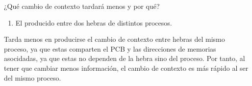 \begin{ejercicio}\label{ej:2.Ejercicio23}
    ¿Qué cambio de contexto tardará menos y por qué?
    \begin{enumerate}[label=(\alph*)]
      \myitem \textbf{El producido entre dos hebras del mismo proceso.}
      \item El producido entre dos hebras de distintos procesos.
    \end{enumerate}

    Tarda menos en producirse el cambio de contexto entre hebras del mismo proceso, ya que estas comparten el PCB y las direcciones de memorias asocidadas, ya que estas no dependen de la hebra sino del proceso. Por tanto, al tener que cambiar menos información, el cambio de contexto es más rápido al ser del mismo proceso.
\end{ejercicio}
